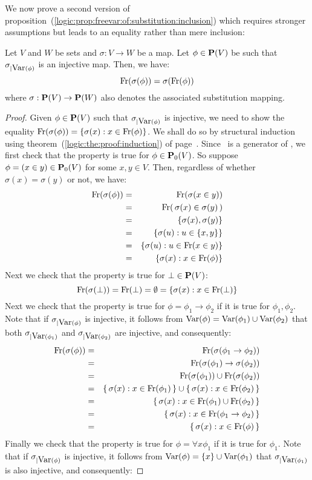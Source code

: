 We now prove a second version of
proposition~(\ref{logic:prop:freevar:of:substitution:inclusion})
which requires stronger assumptions but leads to an equality rather
than mere inclusion:
\begin{prop}\label{logic:prop:freevar:of:substitution}
Let $V$ and $W$ be sets and $\sigma:V\to W$ be a map. Let
$\phi\in\mbox{${\bf P}(V)$}$ be such that $\sigma_{|\mbox{\rm Var}(\phi)}$ is an injective
map. Then, we have:
    \[
    \mbox{\rm Fr}(\sigma(\phi))=\sigma(\mbox{\rm Fr}(\phi))
    \]
where $\sigma:\mbox{${\bf P}(V)$}\to{\bf P}(W)$ also denotes the associated substitution mapping.
\end{prop}
\begin{proof}
Given $\phi\in\mbox{${\bf P}(V)$}$ such that $\sigma_{|\mbox{\rm Var}(\phi)}$ is injective, we
need to show the equality
$\mbox{\rm Fr}(\sigma(\phi))=\{\sigma(x):x\in\mbox{\rm Fr}(\phi)\}$. We shall do so
by structural induction using
theorem~(\ref{logic:the:proof:induction}) of
page~\pageref{logic:the:proof:induction}. Since \pvo\ is a generator
of \pv, we first check that the property is true for $\phi\in\mbox{${\bf P}_{0}(V)$}$.
So suppose $\phi=(x\in y)\in\mbox{${\bf P}_{0}(V)$}$ for some $x,y\in V$. Then,
regardless of whether $\sigma(x)=\sigma(y)$ or not, we have:
    \begin{eqnarray*}
    \mbox{\rm Fr}(\sigma(\phi))&=&\mbox{\rm Fr}(\sigma(x\in y))\\
    &=&\mbox{\rm Fr}(\,\sigma(x)\in\sigma(y)\,)\\
    &=&\{\sigma(x),\sigma(y)\}\\
    &=&\{\sigma(u):u\in\{x,y\}\}\\
    &=&\{\sigma(u):u\in\mbox{\rm Fr}(x\in y)\}\\
    &=&\{\sigma(x):x\in\mbox{\rm Fr}(\phi)\}
    \end{eqnarray*}
Next we check that the property is true for $\bot\in\mbox{${\bf P}(V)$}$:
    \[
    \mbox{\rm Fr}(\sigma(\bot))=\mbox{\rm Fr}(\bot)=\emptyset=\{\sigma(x):x\in\mbox{\rm Fr}(\bot)\}
    \]
Next we check that the property is true for
$\phi=\phi_{1}\to\phi_{2}$ if it is true for $\phi_{1},\phi_{2}$.
Note that if $\sigma_{|\mbox{\rm Var}(\phi)}$ is injective, it follows from
$\mbox{\rm Var}(\phi)=\mbox{\rm Var}(\phi_{1})\cup\mbox{\rm Var}(\phi_{2})$ that both
$\sigma_{|\mbox{\rm Var}(\phi_{1})}$ and $\sigma_{|\mbox{\rm Var}(\phi_{2})}$ are
injective, and consequently:
    \begin{eqnarray*}
    \mbox{\rm Fr}(\sigma(\phi))&=&\mbox{\rm Fr}(\sigma(\phi_{1}\to\phi_{2}))\\
    &=&\mbox{\rm Fr}(\sigma(\phi_{1})\to\sigma(\phi_{2}))\\
    &=&\mbox{\rm Fr}(\sigma(\phi_{1}))\cup\mbox{\rm Fr}(\sigma(\phi_{2}))\\
    &=&\{\,\sigma(x):x\in\mbox{\rm Fr}(\phi_{1})\,\}\cup\{\,\sigma(x):x\in\mbox{\rm Fr}(\phi_{2})\,\}\\
    &=&\{\,\sigma(x):x\in\mbox{\rm Fr}(\phi_{1})\cup\mbox{\rm Fr}(\phi_{2})\,\}\\
    &=&\{\,\sigma(x):x\in\mbox{\rm Fr}(\phi_{1}\to\phi_{2})\,\}\\
    &=&\{\,\sigma(x):x\in\mbox{\rm Fr}(\phi)\,\}
    \end{eqnarray*}
Finally we check that the property is true for $\phi=\forall
x\phi_{1}$ if it is true for $\phi_{1}$. Note that if
$\sigma_{|\mbox{\rm Var}(\phi)}$ is injective, it follows from
$\mbox{\rm Var}(\phi)=\{x\}\cup\mbox{\rm Var}(\phi_{1})$ that $\sigma_{|\mbox{\rm Var}(\phi_{1})}$
is also injective, and consequently:


\end{proof}
